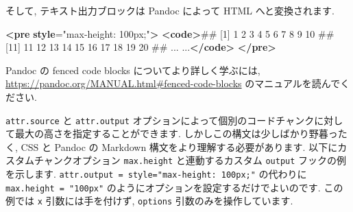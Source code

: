 \documentclass[
  11pt,
  lualatex,ja=standard,jafont=noto]{bxjsreport}
\newenvironment{Shaded}{\begin{snugshade}}{\end{snugshade}}
\newcommand{\ErrorTok}[1]{\textcolor[rgb]{0.64,0.00,0.00}{\textbf{#1}}}
\newcommand{\KeywordTok}[1]{\textcolor[rgb]{0.13,0.29,0.53}{\textbf{#1}}}
\newcommand{\NormalTok}[1]{#1}
\newcommand{\OtherTok}[1]{\textcolor[rgb]{0.56,0.35,0.01}{#1}}
\newcommand{\StringTok}[1]{\textcolor[rgb]{0.31,0.60,0.02}{#1}}
\begin{document}
そして, テキスト出力ブロックは Pandoc によって HTML へと変換されます.

\begin{Shaded}
\begin{Highlighting}[]
\KeywordTok{\textless{}pre} \ErrorTok{style}\OtherTok{=}\StringTok{"max{-}height: 100px;"}\KeywordTok{\textgreater{}}
\KeywordTok{\textless{}code\textgreater{}}\NormalTok{\#\#   [1]   1   2   3   4   5   6   7   8   9  10}
\NormalTok{\#\#  [11]  11  12  13  14  15  16  17  18  19  20}
\NormalTok{\#\#  ... ...}\KeywordTok{\textless{}/code\textgreater{}}
\KeywordTok{\textless{}/pre\textgreater{}}
\end{Highlighting}
\end{Shaded}

Pandoc の fenced code blocks についてより詳しく学ぶには, \url{https://pandoc.org/MANUAL.html\#fenced-code-blocks} のマニュアルを読んでください.

\texttt{attr.source} と \texttt{attr.output} オプションによって個別のコードチャンクに対して最大の高さを指定することができます. しかしこの構文は少しばかり野暮ったく, CSS と Pandoc の Markdown 構文をより理解する必要があります. 以下にカスタムチャンクオプション \texttt{max.height} と連動するカスタム \texttt{output} フックの例を示します. \texttt{attr.output = \textquotesingle{}style="max-height:\ 100px;"\textquotesingle{}} の代わりに \texttt{max.height = "100px"} のようにオプションを設定するだけでよいのです. この例では \texttt{x} 引数には手を付けず, \texttt{options} 引数のみを操作しています.
\end{document}
